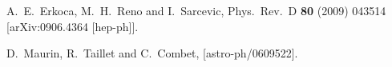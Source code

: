 \documentclass[12pt,a4paper]{article}
\begin{document}
\begin{thebibliography}{}
  A.~E.~Erkoca, M.~H.~Reno and I.~Sarcevic,
  Phys.\ Rev.\ D {\bf 80} (2009) 043514
  [arXiv:0906.4364 [hep-ph]].

  D.~Maurin, R.~Taillet and C.~Combet,
  [astro-ph/0609522].
  
\end{thebibliography}
\end{document}
